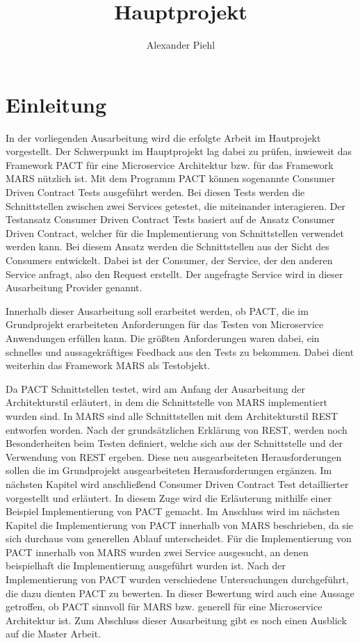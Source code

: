 \documentclass{llncs}
\title{Hauptprojekt}
\author{Alexander Piehl\\\email{alexander.piehl@haw-hamburg.de}
\institute{Hamburg University of Applied Sciences,\\Dept. Computer Science, \\ Berliner Tor 7\\ 20099 Hamburg, Germany\\}}
\begin{document}
\maketitle
\section{Einleitung}
In der vorliegenden Ausarbeitung wird die erfolgte Arbeit im Hautprojekt vorgestellt. Der Schwerpunkt im Hauptprojekt lag dabei zu prüfen, inwieweit das Framework PACT für eine Microservice Architektur bzw. für das Framework MARS nützlich ist. Mit dem Programm PACT können sogenannte Consumer Driven Contract Tests ausgeführt werden. Bei diesen Tests werden die Schnittstellen zwischen zwei Services getestet, die miteinander interagieren. Der Testansatz Consumer Driven Contract Tests basiert auf de Ansatz Consumer Driven Contract, welcher für die Implementierung von Schnittstellen verwendet werden kann. Bei diesem Ansatz werden die Schnittstellen aus der Sicht des Consumers entwickelt. Dabei ist der Consumer, der Service, der den anderen Service anfragt, also den Request erstellt. Der angefragte Service wird in dieser Ausarbeitung Provider genannt.

Innerhalb dieser Ausarbeitung soll erarbeitet werden, ob PACT, die im Grundprojekt erarbeiteten Anforderungen für das Testen von Microservice Anwendungen erfüllen kann. Die größten Anforderungen waren dabei, ein schnelles und aussagekräftiges Feedback aus den Tests zu bekommen. Dabei dient weiterhin das Framework MARS als Testobjekt.

Da PACT Schnittstellen testet, wird am Anfang der Ausarbeitung der Architekturstil erläutert, in dem die Schnittstelle von MARS implementiert wurden sind. In MARS sind alle Schnittstellen mit dem Architekturstil REST entworfen worden. Nach der grundsätzlichen Erklärung von REST, werden noch Besonderheiten beim Testen definiert, welche sich aus der Schnittstelle und der Verwendung von REST ergeben. Diese neu ausgearbeiteten Herausforderungen sollen die im Grundprojekt ausgearbeiteten Herausforderungen ergänzen. 
Im nächsten Kapitel wird anschließend Consumer Driven Contract Test detaillierter vorgestellt und erläutert. In diesem Zuge wird die Erläuterung mithilfe einer Beispiel Implementierung von PACT gemacht. Im Anschluss wird im nächsten Kapitel die Implementierung von PACT innerhalb von MARS beschrieben, da sie sich durchaus vom generellen Ablauf unterscheidet. Für die Implementierung von PACT innerhalb von MARS wurden zwei Service ausgesucht, an denen beispielhaft die Implementierung ausgeführt wurden ist. Nach der Implementierung von PACT wurden verschiedene Untersuchungen durchgeführt, die dazu dienten PACT zu bewerten. In dieser Bewertung wird auch eine Aussage getroffen, ob PACT sinnvoll für MARS bzw. generell für eine Microservice Architektur ist. Zum Abschluss dieser Ausarbeitung gibt es noch einen Ausblick auf die Master Arbeit.
\nocite{*}
\end{document}
